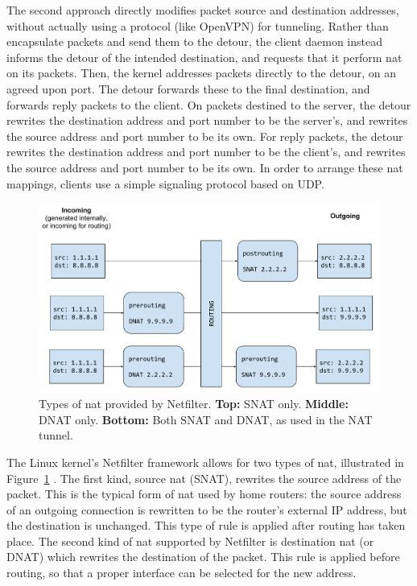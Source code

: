 \documentclass{cwru}
\begin{document}
The second approach directly modifies packet source and destination addresses,
without actually using a protocol (like OpenVPN) for tunneling. Rather than
encapsulate packets and send them to the detour, the client daemon instead
informs the detour of the intended destination, and requests that it perform
\ac{nat} on its packets. Then, the kernel addresses packets directly to the
detour, on an agreed upon port. The detour forwards these to the final
destination, and forwards reply packets to the client. On packets destined to
the server, the detour rewrites the destination address and port number to be
the server's, and rewrites the source address and port number to be its own. For
reply packets, the detour rewrites the destination address and port number to be
the client's, and rewrites the source address and port number to be its own. In
order to arrange these \ac{nat} mappings, clients use a simple signaling
protocol based on UDP.

\begin{figure}
  \centering
  \includegraphics[height=0.3\textheight]{figures/NATTypes.pdf}
  \caption[Types of \ac{nat} provided by Netfilter]{Types of \ac{nat} provided
    by Netfilter. \textbf{Top:} SNAT only. \textbf{Middle:} DNAT only.
    \textbf{Bottom:} Both SNAT and DNAT, as used in the NAT tunnel.}
  \label{fig:NATTypes}
\end{figure}

The Linux kernel's Netfilter framework allows for two types of \ac{nat},
illustrated in Figure~\ref{fig:NATTypes} \cite{russell2002nat}. The first kind,
source \ac{nat} (SNAT), rewrites the source address of the packet. This is the
typical form of \ac{nat} used by home routers: the source address of an outgoing
connection is rewritten to be the router's external IP address, but the
destination is unchanged. This type of rule is applied after routing has taken
place. The second kind of \ac{nat} supported by Netfilter is destination
\ac{nat} (or DNAT) which rewrites the destination of the packet. This rule is
applied before routing, so that a proper interface can be selected for the new
address.
\end{document}
